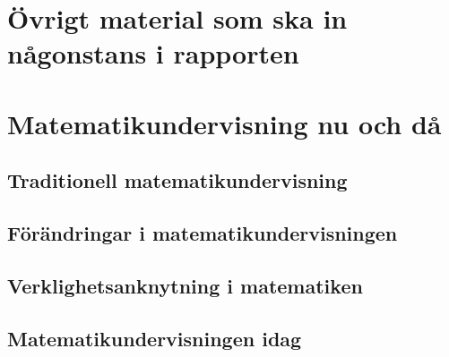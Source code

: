 \documentclass[11pt,a4paper]{article}
\begin{document}



\newpage

\renewcommand\abstractname{Sammandrag}\begin{abstract}

\end{abstract}

\newpage

\renewcommand\abstractname{Abstract}
\begin{abstract} 

\end{abstract}

\newpage
 
\tableofcontents

\newpage
{}

\section*{Övrigt material som ska in någonstans i rapporten}
    

\section{Matematikundervisning nu och då}
    
        
    \subsection{Traditionell matematikundervisning}
        
    
    \subsection{Förändringar i matematikundervisningen}
        \label{sec:Forandringar}
        
        
    \subsection{Verklighetsanknytning i matematiken}
        \label{sec:Verklighetsanknytning}
        
        
    \subsection{Matematikundervisningen idag}
        
        
\end{document}
